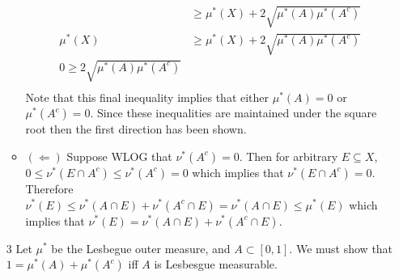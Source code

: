 \documentclass[12pt, letterpaper]{article}
\begin{document}
\begin{enumerate}
\begin{itemize}
\begin{align*}
			&\geq \mu^*(X) + 2 \sqrt{\mu^*(A)\mu^*(A^c)}\\
			\mu^*(X) &\geq \mu^*(X) + 2 \sqrt{\mu^*(A)\mu^*(A^c)}\\
			0 \geq 2 \sqrt{\mu^*(A)\mu^*(A^c)}\\
		\end{align*}
		Note that this final inequality implies that either $\mu^*(A) = 0$ or 
		$\mu^*(A^c) = 0$.  Since these inequalities are maintained under the square root 
		then the first direction has been shown.
		\item $(\Leftarrow)$  Suppose WLOG that $\nu^*(A^c) = 0$.  
		Then for arbitrary $E \subseteq X$, 
		$0 \leq \nu^*(E \cap A^c) \leq \nu^*(A^c) = 0$ which implies that 
		$\nu^*(E \cap A^c) = 0$. Therefore 
		$\nu^*(E) \leq \nu^*(A \cap E) + \nu^*(A^c \cap E) = \nu^*(A \cap E) \leq \mu^*(E)$ which implies 
		that $\nu^*(E) = \nu^*(A \cap E) + \nu^*(A^c \cap E)$.  
\end{itemize}		 
	\item[3] Let $\mu^*$ be the Lesbegue outer measure, and $A \subset [0,1]$.  We must show that 
	$1 = \mu^*(A) + \mu^*(A^c)$ iff $A$ is Lesbesgue measurable.  
\end{enumerate}
\end{document}
